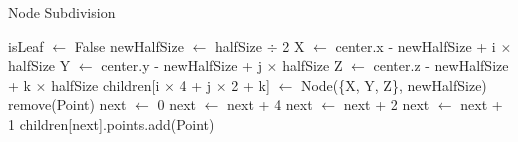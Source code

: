 \documentclass[conference]{IEEEtran}
\begin{document}
\begin{algorithm}[h]
    \caption{Node Subdivision}\label{alg:octree subdivide}
    \begin{algorithmic}[1]
        \State isLeaf $\leftarrow$ False
        \State newHalfSize $\leftarrow$ halfSize $\div$ 2
        \State X $\leftarrow$ center.x - newHalfSize + i $\times$ halfSize
        \State Y $\leftarrow$ center.y - newHalfSize + j $\times$ halfSize
        \State Z $\leftarrow$ center.z - newHalfSize + k $\times$ halfSize
        \State children[i $\times$ 4 + j $\times$ 2 + k] $\leftarrow$ Node(\{X, Y, Z\}, newHalfSize)
        \EndFor
        \EndFor
        \EndFor
        \State remove(Point)
        \State next $\leftarrow$ 0
        \State next $\leftarrow$ next + 4
        \EndIf
        \State next $\leftarrow$ next + 2
        \EndIf
        \State next $\leftarrow$ next + 1
        \EndIf
        \State children[next].points.add(Point)
        \EndFor
    \end{algorithmic}
\end{algorithm}
\end{document}
